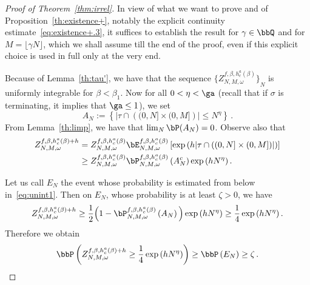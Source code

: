 \begin{proof}[Proof of Theorem~\ref{thm:irrel}]
In view of what we want to prove and of Proposition~\ref{th:existence+}, notably the explicit continuity estimate~\eqref{eq:existence+.3}, it suffices to establish the result for $\gamma\in \bbQ$ and for $M=\lfloor \gamma N \rfloor$, which we shall assume till the end of the proof, even if this explicit choice is used in full only at the very end.

Because of Lemma~\ref{th:tau'}, we have that the sequence ${ \lbrace Z_{N,M,\omega}^{f,\beta,h_c^a(\beta)} \rbrace}_{N}$ is uniformly integrable for $\beta<\beta_1$. Now for all $0<\eta < \ga$ (recall that if $\sigma$ is terminating, it implies that $\ga\leq 1$), we set
\begin{equation}\label{eq:AN}
A_{N} := \left\lbrace \vert \tau \cap \left((0,N] \times (0,M] \right) \rvert \le N^{\eta} \right\rbrace\,.
\end{equation}
From Lemma~\ref{th:limp}, we have that $\lim_N \bP(A_{N}) =0$. Observe also that
\begin{equation}\label{eq:binfz}
\begin{split}
Z_{N,M,\omega}^{f,\beta,h_c^a(\beta)+h} & = Z_{N,M,\omega}^{f,\beta,h_c^a(\beta)} \bE_{N,M,\omega}^{f,\beta,h_c^a(\beta)} \left[\exp \left(h \lvert \tau \cap \left((0,N]\times(0,M] \right) \rvert \right)\right] \\
& \ge Z_{N,M,\omega}^{f,\beta,h_c^a(\beta)} \bP_{N,M,\omega}^{f,\beta,h_c^a(\beta)} \left({A}^{c}_{N} \right) \exp \left(h N^{\eta} \right).
\end{split}
\end{equation}


Let us call $E_N$ the event whose probability is estimated from below in~\eqref{eq:unint1}. Then on $E_N$, whose probability is at least $\zeta >0$, we have
\begin{equation}\label{eq:zfb}
Z_{N,M,\omega}^{f,\beta,h_c^a(\beta)+h}
\ge \frac{1}{2} \Big(1- \bP_{N,M,\omega}^{f,\beta,h_c^a(\beta)} \left(A_{N} \right) \Big) \exp \left(h N^\eta\right)
\ge \frac1 4 \exp \left(h N^{\eta}\right).
\end{equation}
Therefore we obtain
\begin{equation}\label{eq:zfpb}
\bbP \left(Z_{N,M,\omega}^{f,\beta,h_c^a(\beta)+h} \ge \frac{1}{4} \exp \left(h N^{\eta}\right) \right) \ge \bbP\left(E_N\right) \ge \zeta\,.
\end{equation}


\end{proof}
